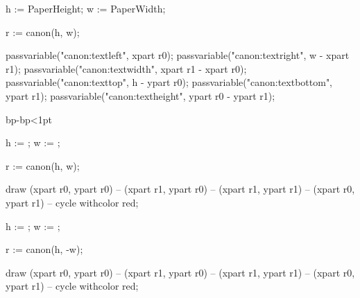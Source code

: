%
%
%

\startMPcalculation
	h := PaperHeight;
	w := PaperWidth;

	r := canon(h, w); %

	passvariable("canon:textleft",   xpart r0);
	passvariable("canon:textright",  w - xpart r1);
	passvariable("canon:textwidth",  xpart r1 - xpart r0);
	passvariable("canon:texttop",    h - ypart r0);
	passvariable("canon:textbottom", ypart r1);
	passvariable("canon:textheight", ypart r0 - ypart r1);
\stopMPcalculation

%
	\ifabsdim\dimexpr{}bp-bp\relax<1pt
		\enablemode[singlesided]
	\else
		\enablemode[doublesided]
	\fi
\stopnotallmodes

\startmode[debug]

			h := \overlayheight;
			w := \overlaywidth;

			r := canon(h, w);

			draw (xpart r0, ypart r0)
			  -- (xpart r1, ypart r0)
			  -- (xpart r1, ypart r1)
			  -- (xpart r0, ypart r1) -- cycle withcolor red;

		\stopreusableMPgraphic

	\stopmode

	\startmode[doublesided]
			h := \overlayheight;
			w := \overlaywidth;

			r := canon(h, -w);

			draw (xpart r0, ypart r0)
			  -- (xpart r1, ypart r0)
			  -- (xpart r1, ypart r1)
			  -- (xpart r0, ypart r1) -- cycle withcolor red;

		\stopreusableMPgraphic

	\stopmode


